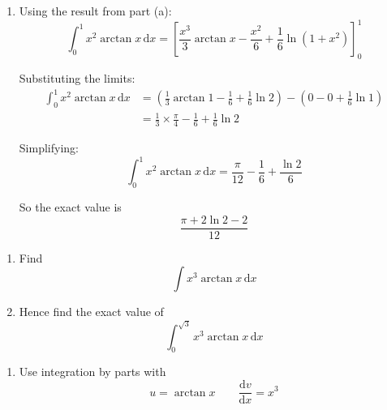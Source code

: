 \documentclass[leqno]{article}
\begin{document}
\begin{enumerate}[
  label=\textbf{\arabic*.},
  leftmargin=*,
  topsep=0pt,
  partopsep=0pt,
  parsep=0pt
]
\begin{djsSolution}
\begin{enumerate}[label=\textbf{(\alph*)}]
Now
\[
\int x\,\mathrm{d}x=\frac{x^2}{2}
\]

and, using the substitution $t=1+x^2$:
\[
\int \frac{x}{1+x^2}\,\mathrm{d}x=\frac12\ln(1+x^2)
\]

Hence
\begin{align*}
I&=\frac{x^3}{3}\arctan x-\frac13\left(\frac{x^2}{2}-\frac12\ln(1+x^2)\right)+c\\
&=\frac{x^3}{3}\arctan x-\frac{x^2}{6}+\frac16\ln(1+x^2)+c
\end{align*}

Therefore
\[
\int x^2\arctan x\,\mathrm{d}x=\frac{x^3}{3}\arctan x-\frac{x^2}{6}+\frac16\ln(1+x^2)+c
\]

  \item Using the result from part (a):
\[
\int_0^1 x^2\arctan x\,\mathrm{d}x
=
\left[\frac{x^3}{3}\arctan x-\frac{x^2}{6}+\frac16\ln(1+x^2)\right]_0^1
\]

Substituting the limits:
\begin{align*}
\int_0^1 x^2\arctan x\,\mathrm{d}x
&=\left(\frac13\arctan1-\frac16+\frac16\ln 2\right)-\left(0-0+\frac16\ln 1\right)\\
&=\frac13\times\frac{\pi}{4}-\frac16+\frac16\ln 2
\end{align*}

Simplifying:
\[
\int_0^1 x^2\arctan x\,\mathrm{d}x=\frac{\pi}{12}-\frac16+\frac{\ln 2}{6}
\]

So the exact value is
\[
\frac{\pi+2\ln 2-2}{12}
\]
\end{enumerate}
\end{djsSolution}


\newpage

\questionitem

\begin{enumerate}[label=\textbf{(\alph*)}]
  \item Find
  \[
  \int x^3\arctan x\,\mathrm{d}x
  \]
  \item Hence find the exact value of
  \[
  \int_0^{\sqrt{3}} x^3\arctan x\,\mathrm{d}x
  \]
\end{enumerate}

\vspace*{10pt}

\begin{djsSolution}
\begin{enumerate}[label=\textbf{(\alph*)}]
  \item Use integration by parts with
  \[
  u=\arctan x \qquad \frac{\mathrm{d}v}{\mathrm{d}x}=x^3
  \]


\end{enumerate}
\end{djsSolution}
\end{enumerate}
\end{document}
